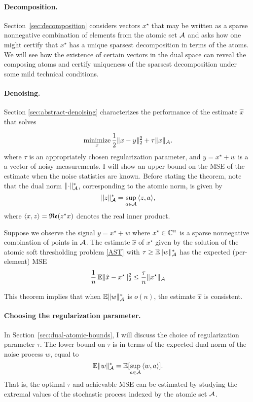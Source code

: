\paragraph*{Decomposition.} Section~\ref{sec:decomposition} considers
vectors $x^\star$ that may be written as a sparse nonnegative combination of
elements from the atomic set $\mathcal{A}$ and asks how one might certify that $x^\star$
has a unique sparsest decomposition in terms of the atoms. We will see how the
existence of certain vectors in the dual space can reveal the composing atoms
and certify uniqueness of the sparsest decomposition under some mild technical
conditions.

\paragraph*{Denoising.} Section \ref{sec:abstract-denoising} characterizes the performance of the estimate $\hat{x}$ that solves

\begin{equation}
\label{AST}\mathop{\textrm{minimize}}_x \frac{1}{2} \lVert x - y\rVert_2^2 + \tau \lVert x\rVert_{\mathcal{A}}.
\end{equation}
where $\tau$ is an appropriately chosen regularization parameter, and $y =
x^\star + w$ is a a vector of noisy measurements. I will show an upper bound on
the MSE of the estimate when the noise statistics are known. Before stating the
theorem, note that the dual norm $\lVert\cdot\rVert_{\mathcal{A}}^*$, corresponding to the
atomic norm, is given by
\[
 \lVert z\rVert_{\mathcal{A}}^* = \sup_{a \in \mathcal{A}}{\langle z, a\rangle},
\]
where $\langle x, z\rangle = \mathop{\mathfrak{Re}}(z^*x)$ denotes the real inner product.  

\begin{theorem}
\label{cor:expected-mse}

Suppose we observe the signal $y = x^\star + w$ where $x^\star \in \mathbb{C}^n$ is a
sparse nonnegative combination of points in $\mathcal{A}$. The estimate $\hat{x}$ of
$x^\star$ given by the solution of the atomic soft thresholding problem
\eqref{AST} with $\tau \geq \operatorname{\mathbb{E}} \lVert w\rVert_{\mathcal{A}}^*$ has the expected (per-element)
MSE
\[ 
\frac{1}{n}\operatorname{\mathbb{E}} \lVert\hat{x} - x^\star\rVert_2^2 \leq \frac{\tau}{n}\lVert x^\star\rVert_{\mathcal{A}}
\]

\end{theorem}

This theorem implies that when $\operatorname{\mathbb{E}} \lVert w\rVert_{\mathcal{A}}^*$ is $o(n)$, the estimate
$\hat{x}$ is consistent.

\paragraph*{Choosing the regularization parameter.} In
Section~\ref{sec:dual-atomic-bounds}, I will discuss the choice of
regularization parameter $\tau$. The lower bound on $\tau$ is in terms of the
expected dual norm of the noise process $w$, equal to
 \[
 	\operatorname{\mathbb{E}} \lVert w\rVert_{\mathcal{A}}^* = \mathbb{E}[\sup_{a\in \mathcal{A}} {\langle w, a\rangle}].
 \]
That is, the optimal $\tau$ and achievable MSE can be estimated
by studying the extremal values of the stochastic process indexed by the atomic
set $\mathcal{A}$.

